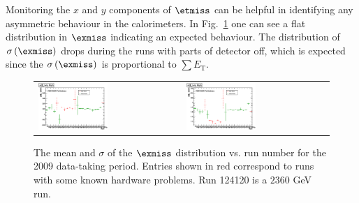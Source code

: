 Monitoring the $x$ and $y$ components of $\etmiss$ can be helpful in
identifying any asymmetric behaviour in the
calorimeters. In Fig.~\ref{fig:MEx_vs_run} one can see a flat
distribution in $\exmiss$ indicating an expected behaviour. The
distribution of $\sigma\left(\exmiss\right)$ drops during the runs with parts of
detector off, which is expected since the $\sigma\left(\exmiss\right)$ is
proportional to $\sum E_\text{T}$. 

\begin{figure}[h!]
  \centering
  \begin{tabular}{ll}
    \includegraphics[width=0.5\textwidth]{plots_METStability/h_calometPxMean_vs_run.eps} &
    \includegraphics[width=0.5\textwidth]{plots_METStability/h_calometPxSigma_vs_run.eps} \\
  \end{tabular}
  \caption{\small The mean and $\sigma$ of the $\exmiss$ distribution
    vs. run number for the 2009 data-taking period.  Entries shown in
    red correspond to runs with some known hardware problems. Run 124120 is a $2360$ GeV run.\label{fig:MEx_vs_run}}
\end{figure}

